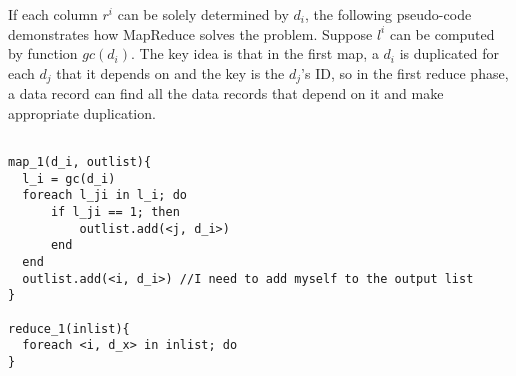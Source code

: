 \documentclass[10pt, twocolumn, a4paper]{article}
\begin{document}
If each column $r^i$ can be solely determined by $d_i$, the following pseudo-code demonstrates how MapReduce solves the problem. Suppose $l^i$ can be computed by function $gc(d_i)$. The key idea is that in the first map, a $d_i$ is duplicated for each $d_j$ that it depends on and the key is the $d_j$'s ID, so in the first reduce phase, a data record can find all the data records that depend on it and make appropriate duplication.

\begin{Verbatim}

map_1(d_i, outlist){
  l_i = gc(d_i)
  foreach l_ji in l_i; do
      if l_ji == 1; then
          outlist.add(<j, d_i>)
      end
  end
  outlist.add(<i, d_i>) //I need to add myself to the output list
}

reduce_1(inlist){
  foreach <i, d_x> in inlist; do
}
\end{Verbatim}
\end{document}
